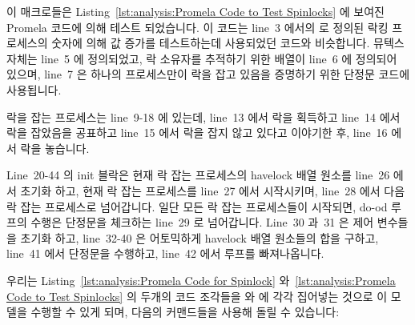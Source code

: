 이 매크로들은
Listing~\ref{lst:analysis:Promela Code to Test Spinlocks}
에 보여진 Promela 코드에 의해 테스트 되었습니다.
이 코드는 line~3 에서의  로 정의된 락킹 프로세스의 숫자에 의해 값
증가를 테스트하는데 사용되었던 코드와 비슷합니다.
뮤텍스 자체는 line~5 에 정의되었고, 락 소유자를 추적하기 위한 배열이 line~6 에
정의되어 있으며, line~7 은 하나의 프로세스만이 락을 잡고 있음을 증명하기 위한
단정문 코드에 사용됩니다.

락을 잡는 프로세스는 line~9-18 에 있는데, line~13 에서 락을 획득하고 line~14
에서 락을 잡았음을 공표하고 line~15 에서 락을 잡지 않고 있다고 이야기한 후,
line~16 에서 락을 놓습니다.
\iffalse

\begin{lineref}[ln:formal:promela:lock:spin]
These macros are tested by the Promela code shown in
Listing~\ref{lst:formal:Promela Code to Test Spinlocks}.
This code is similar to that used to test the increments,
with the number of locking processes defined by the \co{N_LOCKERS}
macro definition on line~\lnref{nlockers}.
The mutex itself is defined on line~\lnref{mutex},
an array to track the lock owner
on line~\lnref{array}, and line~\lnref{sum} is used by assertion
code to verify that only one process holds the lock.
\end{lineref}

\begin{lineref}[ln:formal:promela:lock:spin:locker]
The locker process is on lines~\lnref{b}-\lnref{e}, and simply loops forever
acquiring the lock on line~\lnref{lock}, claiming it on line~\lnref{claim},
unclaiming it on line~\lnref{unclaim}, and releasing it on line~\lnref{unlock}.
\end{lineref}
\fi

Line~20-44 의 init 블락은 현재 락 잡는 프로세스의 havelock 배열 원소를 line~26
에서 초기화 하고, 현재 락 잡는 프로세스를 line~27 에서 시작시키며, line~28 에서
다음 락 잡는 프로세스로 넘어갑니다.
일단 모든 락 잡는 프로세스들이 시작되면, do-od 루프의 수행은 단정문을 체크하는
line~29 로 넘어갑니다.
Line~30 과~31 은 제어 변수들을 초기화 하고, line~32-40 은 어토믹하게 havelock
배열 원소들의 합을 구하고, line~41 에서 단정문을 수행하고, line~42 에서 루프를
빠져나옵니다.

우리는
Listing~\ref{lst:analysis:Promela Code for Spinlock}
와~\ref{lst:analysis:Promela Code to Test Spinlocks} 의 두개의 코드 조각들을
 와  에 각각 집어넣는 것으로 이 모델을 수행할 수
있게 되며, 다음의 커맨드들을 사용해 돌릴 수 있습니다:
\iffalse

